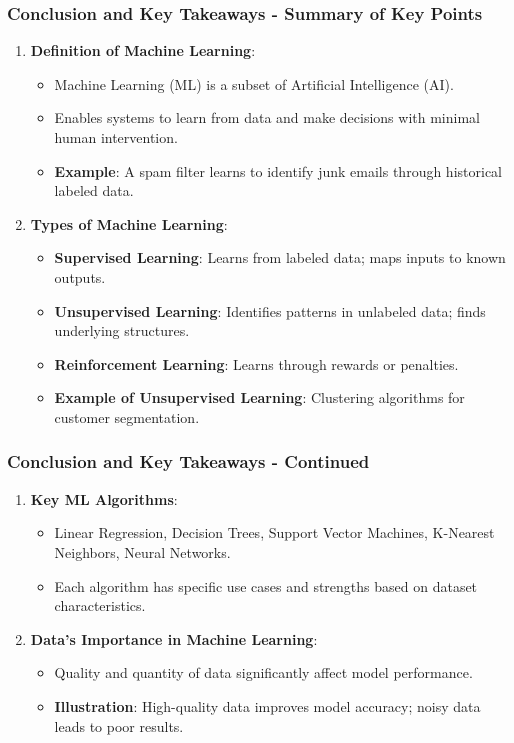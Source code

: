 \documentclass[aspectratio=169]{beamer}
\begin{document}
\begin{frame}[fragile]
    \frametitle{Conclusion and Key Takeaways - Summary of Key Points}
    \begin{enumerate}
        \item \textbf{Definition of Machine Learning}:
            \begin{itemize}
                \item Machine Learning (ML) is a subset of Artificial Intelligence (AI).
                \item Enables systems to learn from data and make decisions with minimal human intervention.
                \item \textbf{Example}: A spam filter learns to identify junk emails through historical labeled data.
            \end{itemize}

        \item \textbf{Types of Machine Learning}:
            \begin{itemize}
                \item \textbf{Supervised Learning}: Learns from labeled data; maps inputs to known outputs.
                \item \textbf{Unsupervised Learning}: Identifies patterns in unlabeled data; finds underlying structures.
                \item \textbf{Reinforcement Learning}: Learns through rewards or penalties.
                \item \textbf{Example of Unsupervised Learning}: Clustering algorithms for customer segmentation.
            \end{itemize}
    \end{enumerate}
\end{frame}

\begin{frame}[fragile]
    \frametitle{Conclusion and Key Takeaways - Continued}
    \begin{enumerate}[resume]
        \item \textbf{Key ML Algorithms}:
            \begin{itemize}
                \item Linear Regression, Decision Trees, Support Vector Machines, K-Nearest Neighbors, Neural Networks.
                \item Each algorithm has specific use cases and strengths based on dataset characteristics.
            \end{itemize}

        \item \textbf{Data's Importance in Machine Learning}:
            \begin{itemize}
                \item Quality and quantity of data significantly affect model performance.
                \item \textbf{Illustration}: High-quality data improves model accuracy; noisy data leads to poor results.
            \end{itemize}
    \end{enumerate}
\end{frame}
\end{document}
